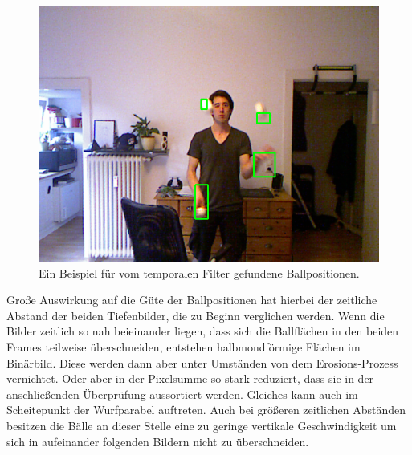 \documentclass[12pt,a4paper,ngerman]{scrartcl}
\begin{document}
\begin{figure}[H]
    \centering
    \includegraphics[scale=0.6]{img/temporal_final.png}
    \caption{Ein Beispiel für vom temporalen Filter gefundene Ballpositionen.}
    \label{temporal_final}
\end{figure}

Große Auswirkung auf die Güte der Ballpositionen hat hierbei der zeitliche Abstand der beiden Tiefenbilder, die zu Beginn verglichen werden. Wenn die Bilder zeitlich so nah beieinander liegen, dass sich die Ballflächen in den beiden Frames teilweise überschneiden, entstehen halbmondförmige Flächen im Binärbild.
Diese werden dann aber unter Umständen von dem Erosions-Prozess vernichtet.
Oder aber in der Pixelsumme so stark reduziert, dass sie in der anschließenden Überprüfung aussortiert werden.
Gleiches kann auch im Scheitepunkt der Wurfparabel auftreten. Auch bei größeren zeitlichen Abständen besitzen die Bälle an dieser Stelle eine zu geringe vertikale Geschwindigkeit um sich in aufeinander folgenden Bildern nicht zu überschneiden.
\end{document}
